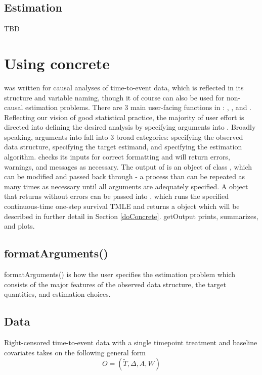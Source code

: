 \documentclass{report}
\newcommand{\1}{\ensuremath{\mathbf{1}}}
\newcommand{\T}{\ensuremath{\widetilde{T}}}
\renewcommand{\L}{\ensuremath{W}}
\begin{document}
\subsection{Estimation}
\label{sec:org8f08af8}
TBD

\section{Using concrete}
\label{sec:org02820b2}

 was written for causal analyses of time-to-event data, which is reflected in its structure and variable naming, though it of course can also be used for non-causal estimation problems. There are 3 main user-facing functions in : , , and . Reflecting our vision of good statistical practice, the majority of user effort is directed into defining the desired analysis by specifying arguments into . Broadly speaking, arguments into  fall into 3 broad categories: specifying the observed data structure, specifying the target estimand, and specifying the estimation algorithm.  checks its inputs for correct formatting and will return errors, warnings, and messages as necessary. The output of  is an object of class , which can be modified and passed back through  - a process than can be repeated as many times as necessary until all arguments are adequately specified. A  object that returns without errors can be passed into , which runs the specified continuous-time one-step survival TMLE and returns a  object which will be described in further detail in Section \ref{doConcrete}. getOutput prints, summarizes, and plots.

\subsection{formatArguments()}
\label{sec:org81c34d7}
formatArguments() is how the user specifies the estimation problem which consists of the major features of the observed data structure, the target quantities, and estimation choices.

\subsection{Data}
Right-censored time-to-event data with a single timepoint treatment and baseline covariates takes on the following general form
\[O = (\T, \Delta, A, \L) \]
\end{document}
